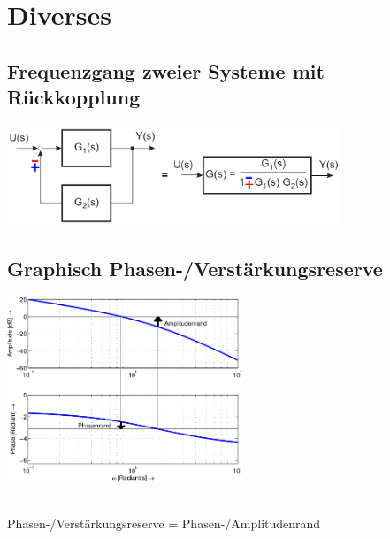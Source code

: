 \section{Diverses}
	\subsection{Frequenzgang zweier Systeme mit Rückkopplung }
			\begin{center}
        		\includegraphics[height=3cm]{./bilder/feedback.png}
        	\end{center}

	\subsection{Graphisch Phasen-/Verstärkungsreserve}
		\parbox{7cm}{
		\includegraphics[width=7cm]{./bilder/bode-stabilitaet.png}
		}\\
		Phasen-/Verstärkungsreserve = Phasen-/Amplitudenrand
		
		
\newpage
